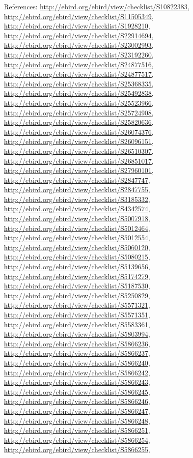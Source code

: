 \documentclass[9pt, article]{memoir}
\begin{document}
\begin{multicols}{2}
References: 
\url{http://ebird.org/ebird/view/checklist/S10822383}, 
\url{http://ebird.org/ebird/view/checklist/S11505349}, 
\url{http://ebird.org/ebird/view/checklist/S1928210}, 
\url{http://ebird.org/ebird/view/checklist/S22914694}, 
\url{http://ebird.org/ebird/view/checklist/S23002993}, 
\url{http://ebird.org/ebird/view/checklist/S23192260}, 
\url{http://ebird.org/ebird/view/checklist/S24877516}, 
\url{http://ebird.org/ebird/view/checklist/S24877517}, 
\url{http://ebird.org/ebird/view/checklist/S25368335}, 
\url{http://ebird.org/ebird/view/checklist/S25492838}, 
\url{http://ebird.org/ebird/view/checklist/S25523966}, 
\url{http://ebird.org/ebird/view/checklist/S25724908}, 
\url{http://ebird.org/ebird/view/checklist/S25820636}, 
\url{http://ebird.org/ebird/view/checklist/S26074376}, 
\url{http://ebird.org/ebird/view/checklist/S26096151}, 
\url{http://ebird.org/ebird/view/checklist/S26510307}, 
\url{http://ebird.org/ebird/view/checklist/S26851017}, 
\url{http://ebird.org/ebird/view/checklist/S27960101}, 
\url{http://ebird.org/ebird/view/checklist/S2847747}, 
\url{http://ebird.org/ebird/view/checklist/S2847755}, 
\url{http://ebird.org/ebird/view/checklist/S3185332}, 
\url{http://ebird.org/ebird/view/checklist/S4342574}, 
\url{http://ebird.org/ebird/view/checklist/S5007918}, 
\url{http://ebird.org/ebird/view/checklist/S5012464}, 
\url{http://ebird.org/ebird/view/checklist/S5012554}, 
\url{http://ebird.org/ebird/view/checklist/S5060120}, 
\url{http://ebird.org/ebird/view/checklist/S5080215}, 
\url{http://ebird.org/ebird/view/checklist/S5139656}, 
\url{http://ebird.org/ebird/view/checklist/S5174279}, 
\url{http://ebird.org/ebird/view/checklist/S5187530}, 
\url{http://ebird.org/ebird/view/checklist/S5250829}, 
\url{http://ebird.org/ebird/view/checklist/S5571321}, 
\url{http://ebird.org/ebird/view/checklist/S5571351}, 
\url{http://ebird.org/ebird/view/checklist/S5583361}, 
\url{http://ebird.org/ebird/view/checklist/S5803994}, 
\url{http://ebird.org/ebird/view/checklist/S5866236}, 
\url{http://ebird.org/ebird/view/checklist/S5866237}, 
\url{http://ebird.org/ebird/view/checklist/S5866240}, 
\url{http://ebird.org/ebird/view/checklist/S5866242}, 
\url{http://ebird.org/ebird/view/checklist/S5866243}, 
\url{http://ebird.org/ebird/view/checklist/S5866245}, 
\url{http://ebird.org/ebird/view/checklist/S5866246}, 
\url{http://ebird.org/ebird/view/checklist/S5866247}, 
\url{http://ebird.org/ebird/view/checklist/S5866248}, 
\url{http://ebird.org/ebird/view/checklist/S5866251}, 
\url{http://ebird.org/ebird/view/checklist/S5866254}, 
\url{http://ebird.org/ebird/view/checklist/S5866255}, 

\end{multicols}
\end{document}

